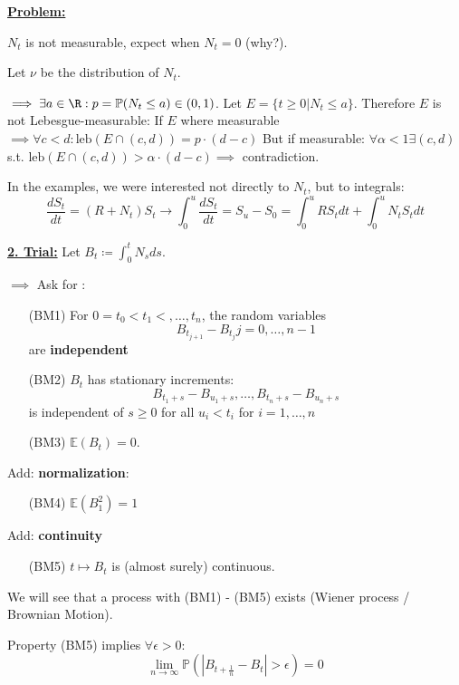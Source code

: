 \underline{\textbf{Problem:}}

$N_t$ is not measurable, expect when $N_t=0$ (why?).

Let $\nu$ be the distribution of $N_t$. 

$\implies \exists a\in \R: p=\mathbb{P}(N_t\leq a)\in (0,1)$.
Let $E=\{t\geq 0| N_t\leq a\}$. Therefore $E$ is not Lebesgue-measurable:
If $E$ where measurable  $\implies \forall c<d: \text{leb}(E\cap (c,d))=p\cdot(d-c)$ 
But if measurable: $\forall \alpha < 1\exists (c,d)$ s.t. $\text{leb}(E\cap (c,d))>\alpha \cdot (d-c) \implies$ contradiction.

In the examples, we were interested not directly to $N_t$, but to integrals: 
\[\frac{dS_t}{dt}=(R+N_t)S_t \to \int_0^u \frac{dS_t}{dt}=S_u-S_0=\int_0^u R S_t dt + \int_0^u N_tS_t dt\]

\underline{\textbf{2. Trial:}} Let $B_t\coloneqq \int_0^t N_s ds$.

$\implies $ Ask for :

\begin{enumerate}
    \item[(BM1)] For $0=t_0<t_1<,\dots,t_n$, the random variables \[B_{t_{j+1}}-B_{t_j} j=0,\dots,n-1\] are \textbf{independent}
    \item[(BM2)] $B_t$ has stationary increments: \[B_{t_1+s}-B_{u_1+s},\dots,B_{t_n+s}-B_{u_n+s}\] is independent of $s\geq 0$ for all $u_i<t_i$ for $i=1,\dots,n$ %
    \item[(BM3)] $\mathbb{E}(B_t)=0$.
\end{enumerate}

Add: \textbf{normalization}:

\begin{enumerate}
    \item[(BM4)] $\mathbb{E}(B_1^2)=1$
\end{enumerate}

Add: \textbf{continuity}

\begin{enumerate}
    \item[(BM5)] $t\mapsto B_t$ is (almost surely) continuous.
\end{enumerate}

We will see that a process with (BM1) - (BM5) exists (Wiener process / Brownian Motion).

\begin{lemma}

    Property (BM5) implies $\forall \epsilon>0$:
    \[\lim_{n\to\infty} \mathbb{P}\left(\left\vert B_{t+\frac{1}{n}}-B_t \right\vert>\epsilon \right)=0\]
\end{lemma}


